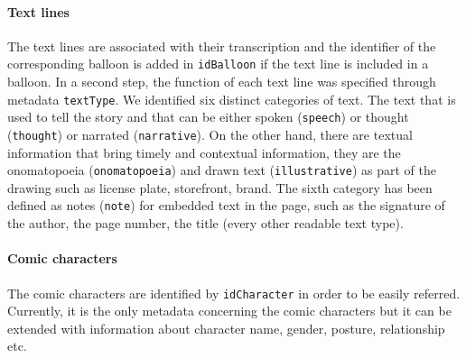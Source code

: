 \paragraph{Text lines}
The text lines are associated with their transcription and the identifier of the corresponding balloon is added in \texttt{{idBalloon}} if the text line is included in a balloon.
In a second step, the function of each text line was specified through metadata \texttt{textType}. 
We identified six distinct categories of text.
The text that is used to tell the story and that can be either spoken (\texttt{speech}) or thought (\texttt{thought}) or narrated (\texttt{narrative}).
On the other hand, there are textual information that bring timely and contextual information, they are the onomatopoeia (\texttt{onomatopoeia}) and drawn text (\texttt{illustrative}) as part of the drawing such as license plate, storefront, brand.
The sixth category has been defined as notes (\texttt{note}) for embedded text in the page, such as the signature of the author, the page number, the title (every other readable text type).

\paragraph{Comic characters} %
\label{par:comic_characters}
The comic characters are identified by \texttt{{idCharacter}} in order to be easily referred.
Currently, it is the only metadata concerning the comic characters but it can be extended with information about character name, gender, posture, relationship etc.




